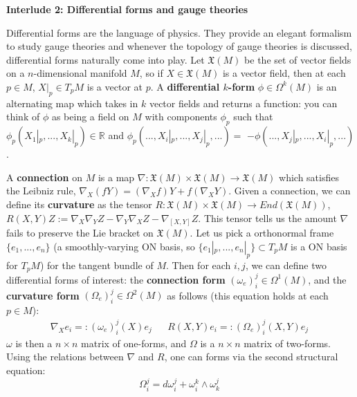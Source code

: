 \documentclass[11pt, oneside]{article}   	%
\theoremstyle{definition}
\newenvironment{answer}{\begin{center}\begin{answerbox}}{\end{answerbox}\end{center}}
\begin{document}
\begin{answer}
	\begin{center}
		\textbf{Interlude 2: Differential forms and gauge theories}
	\end{center}
	\begin{flushleft} \setlength{\parindent}{2em}
	Differential forms are the language of physics. They provide an elegant formalism to study gauge theories and whenever the topology 
	of gauge theories is discussed, differential forms naturally come into play. Let $\mathfrak{X}(M)$ be the set of vector fields on a 
	$n$-dimensional manifold $M$, so if $X\in \mathfrak{X}(M)$ is a vector field, then at each $p\in M$, $X|_p\in T_p M$ is a vector at $p$. 
	A \textbf{differential $k$-form} $\phi\in\Omega^k(M)$ is an alternating map which takes in $k$ vector fields and returns a function: 
	you can think of $\phi$ as being a field on $M$ with components $\phi_p$ such that $\phi_p(X_1|_p, ..., X_k|_p)\in\mathbb 
	R$ and $\phi_p(..., X_i|_p, ..., X_j|_p, ...) = $ $-\phi(..., X_j|_p, ..., X_i|_p, ...)$.
	
	A \textbf{connection} on $M$ is a map $\nabla: \mathfrak X(M) \times \mathfrak{X}(M)\rightarrow\mathfrak{X}(M)$ which satisfies the 
	Leibniz rule, $\nabla_X(fY) = (\nabla_X f) Y + f (\nabla_X Y)$. Given a connection, we can define its \textbf{curvature} as the 
	tensor $R : \mathfrak X(M)\times \mathfrak X(M)\rightarrow End(\mathfrak X(M))$, $R(X, Y) Z := \nabla_X \nabla_Y Z - 
	\nabla_Y\nabla_X Z - \nabla_{[X, Y]} Z$. This tensor tells us the amount $\nabla$ fails to 
	preserve the Lie bracket on $\mathfrak X(M)$. Let us pick a orthonormal frame $\{e_1, ..., e_n\}$ (a smoothly-varying ON basis, so 
	$\{e_1|_p, ..., e_n|_p\}\subset T_p M$ is a ON basis for $T_p M$) for the tangent bundle of $M$. Then for each $i, j$, we can define two 
	differential forms of interest: the \textbf{connection form} $(\omega_e)_i^j\in \Omega^1(M)$, and the \textbf{curvature form} 
	$(\Omega_e)_i^j\in\Omega^2(M)$ as follows (this equation holds at each $p\in M$):
	\begin{align}
		\nabla_X e_i =: (\omega_e)_i^j(X)e_j && R(X, Y) e_i =: (\Omega_e)_i^j(X, Y) e_j~
		\label{eq:change_of_frame}
	\end{align}
	$\omega$ is then a $n\times n$ matrix of one-forms, and $\Omega$ is a $n\times n$ matrix of two-forms. Using the relations between 
	$\nabla$ and $R$, one can forms via the second structural equation:
	\begin{equation}
		\Omega_i^j = d\omega_i^j + \omega_i^k\wedge \omega_k^j~
		\label{eq:second_structural}
	\end{equation}
	

\end{flushleft}
\end{answer}
\end{document}
